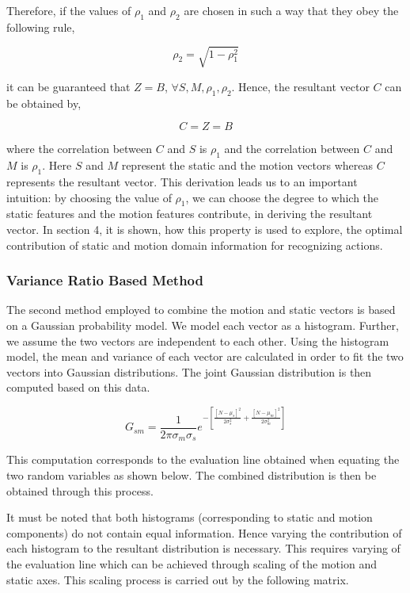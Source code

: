 Therefore, if the values of $\rho_{1}$ and $\rho_{2}$ are chosen in such a way that they obey the following
rule,

\begin{equation}
\rho_{2} = \sqrt{1-\rho_{1}^2}
\end{equation}

it can be guaranteed that $Z = B$, $\forall S,M,\rho_{1},\rho_{2}$. Hence, the resultant vector $C$ can be obtained
by,

\begin{equation}
C=Z=B
\end{equation}

where the correlation between $C$ and $S$ is $\rho_{1}$ and the correlation between $C$ and $M$ is $\rho_{1}$. Here $S$ and $M$ represent the static and the
motion vectors whereas $C$ represents the resultant vector. This derivation
leads us to an important intuition: by choosing the value of $\rho_{1}$, we can
choose the degree to which the static features and the motion features contribute,
in deriving the resultant vector. In section 4, it is shown, how this property is used to explore, the optimal contribution of
static and motion domain information for recognizing actions.

\subsubsection{Variance Ratio Based Method}

The second method employed to combine the motion and static vectors is based on a Gaussian probability model. We model each vector as a histogram. Further, we assume the two vectors are independent to each other. Using the histogram model, the mean and variance of each vector are calculated in order to fit the two vectors into Gaussian distributions. The joint Gaussian distribution is then computed based on this data.

\begin{equation}
G_{sm}= \frac{1}{2\pi\sigma_m\sigma_s} e^{-\left[\frac{[N-\mu_s]^2}{2\sigma_s^2}+ \frac{[N-\mu_m]^2}{2\sigma_m^2} \right]}
\end{equation}

This computation corresponds to the evaluation line obtained when equating the two random variables as shown below. The combined distribution is then be obtained through this process.

It must be noted that both histograms (corresponding to static and motion components) do not contain equal information. Hence varying the contribution of each histogram to the resultant distribution is necessary. This requires varying of the evaluation line which can be achieved through scaling of the motion and static axes. This scaling process is carried out by the following matrix.


